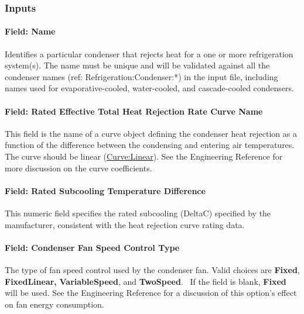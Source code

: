 \subsubsection{Inputs}\label{inputs-8-018}

\paragraph{Field: Name}\label{field-name-9-014}

Identifies a particular condenser that rejects heat for a one or more refrigeration system(s). The name must be unique and will be validated against all the condenser names (ref: Refrigeration:Condenser:*) in the input file, including names used for evaporative-cooled, water-cooled, and cascade-cooled condensers.

\paragraph{Field: Rated Effective Total Heat Rejection Rate Curve Name}\label{field-rated-effective-total-heat-rejection-rate-curve-name}

This field is the name of a curve object defining the condenser heat rejection as a function of the difference between the condensing and entering air temperatures. The curve should be linear (\hyperref[curvelinear]{Curve:Linear}). See the Engineering Reference for more discussion on the curve coefficients.

\paragraph{Field: Rated Subcooling Temperature Difference}\label{field-rated-subcooling-temperature-difference}

This numeric field specifies the rated subcooling (DeltaC) specified by the manufacturer, consistent with the heat rejection curve rating data.

\paragraph{Field: Condenser Fan Speed Control Type}\label{field-condenser-fan-speed-control-type}

The type of fan speed control used by the condenser fan. Valid choices are \textbf{Fixed}, \textbf{FixedLinear,} \textbf{VariableSpeed}, and \textbf{TwoSpeed}.~ If the field is blank, \textbf{Fixed} will be used. See the Engineering Reference for a discussion of this option's effect on fan energy consumption.


